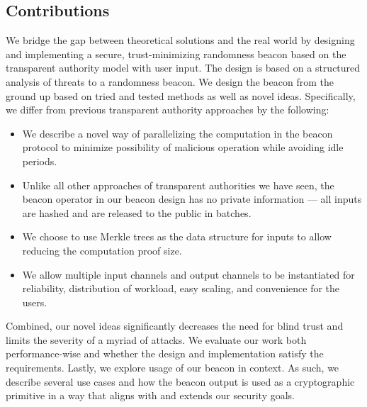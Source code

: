\subsection{Contributions}
We bridge the gap between theoretical solutions and the real world by designing and implementing a secure, trust-minimizing randomness beacon based on the transparent authority model with user input.
The design is based on a structured analysis of threats to a randomness beacon.
We design the beacon from the ground up based on tried and tested methods as well as novel ideas.
Specifically, we differ from previous transparent authority approaches by the following:
\begin{itemize}
    \item We describe a novel way of parallelizing the computation in the beacon protocol to minimize possibility of malicious operation while avoiding idle periods.
    \item Unlike all other approaches of transparent authorities we have seen, the beacon operator in our beacon design has no private information --- all inputs are hashed and are released to the public in batches.
    \item We choose to use Merkle trees as the data structure for inputs to allow reducing the computation proof size.
    \item We allow multiple input channels and output channels to be instantiated for reliability, distribution of workload, easy scaling, and convenience for the users.
\end{itemize}
Combined, our novel ideas significantly decreases the need for blind trust and limits the severity of a myriad of attacks.
We evaluate our work both performance-wise and whether the design and implementation satisfy the requirements.
Lastly, we explore usage of our beacon in context.
As such, we describe several use cases and how the beacon output is used as a cryptographic primitive in a way that aligns with and extends our security goals.
